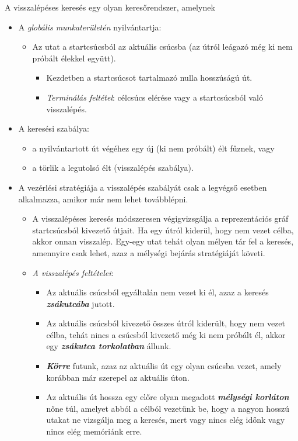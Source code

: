 \documentclass[12pt,margin=0px]{article}
\begin{document}
    A visszalépéses keresés egy olyan keresőrendszer, amelynek
    \begin{itemize}
        \item A \emph{globális munkaterületén} nyilvántartja:
            \begin{itemize}
                \item Az utat a startcsúcsból az aktuális csúcsba (az útról leágazó még ki nem próbált élekkel együtt).
                \begin{itemize}
                    \small
                    \color{mygray}
                    \item Kezdetben a startcsúcsot tartalmazó nulla hosszúságú út.
                    \item \emph{Terminálás feltétel}: célcsúcs elérése vagy a startcsúcsból való visszalépés.
                \end{itemize}
            \end{itemize}
        \item A keresési szabálya:
        \begin{itemize}
            \item a nyilvántartott út végéhez egy új (ki nem próbált) élt fűznek, vagy
            \item a törlik a legutolsó élt (visszalépés szabálya).
        \end{itemize}
        \item A vezérlési stratégiája a visszalépés szabályát csak a legvégső esetben alkalmazza, amikor már nem lehet továbblépni.
        \begin{itemize}
            \item A visszalépéses keresés módszeresen végigvizsgálja a reprezentációs gráf startcsúcsból kivezető útjait. Ha egy útról kiderül, hogy nem vezet célba, akkor onnan visszalép. Egy-egy utat tehát olyan mélyen tár fel a keresés, amennyire csak lehet, azaz a mélységi bejárás stratégiáját követi.
            \item \emph{A visszalépés feltételei}:
                \begin{itemize}
                    \item Az aktuális csúcsból egyáltalán nem vezet ki él, azaz a keresés \textbf{\emph{zsákutcába}} jutott.
                    \item Az aktuális csúcsból kivezető összes útról kiderült, hogy nem vezet célba, tehát nincs a csúcsból kivezető még ki nem próbált él, akkor egy \textbf{\emph{zsákutca torkolatban}} állunk.
                    \item \textbf{\emph{Körre}} futunk, azaz az aktuális út egy olyan csúcsba vezet, amely korábban már szerepel az aktuális úton.
                    \item Az aktuális út hossza egy előre olyan megadott \textbf{\emph{mélységi korláton}} nőne túl, amelyet abból a célból vezetünk be, hogy a nagyon hosszú utakat ne vizsgálja meg a keresés, mert vagy nincs elég időnk vagy nincs elég memóriánk erre.
            \end{itemize}
        \end{itemize}
    \end{itemize}
\end{document}
